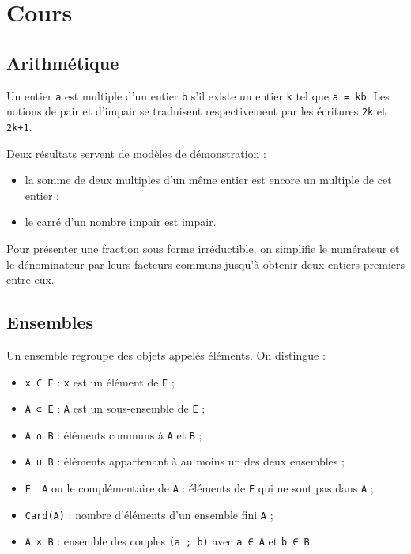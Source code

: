 \section{Cours}

\subsection{Arithmétique}

Un entier \texttt{a} est multiple d'un entier \texttt{b} s'il existe un entier \texttt{k} tel que \texttt{a = kb}. Les notions de pair et d'impair se traduisent respectivement par les écritures \texttt{2k} et \texttt{2k+1}.

Deux résultats servent de modèles de démonstration :

\begin{itemize}
\item la somme de deux multiples d'un même entier est encore un multiple de cet entier ;
\item le carré d'un nombre impair est impair.
\end{itemize}

Pour présenter une fraction sous forme irréductible, on simplifie le numérateur et le dénominateur par leurs facteurs communs jusqu'à obtenir deux entiers premiers entre eux.

\subsection{Ensembles}

Un ensemble regroupe des objets appelés éléments. On distingue :

\begin{itemize}
\item \texttt{x ∈ E} : \texttt{x} est un élément de \texttt{E} ;
\item \texttt{A ⊂ E} : \texttt{A} est un sous-ensemble de \texttt{E} ;
\item \texttt{A ∩ B} : éléments communs à \texttt{A} et \texttt{B} ;
\item \texttt{A ∪ B} : éléments appartenant à au moins un des deux ensembles ;
\item \texttt{E \ A} ou le complémentaire de \texttt{A} : éléments de \texttt{E} qui ne sont pas dans \texttt{A} ;
\item \texttt{Card(A)} : nombre d'éléments d'un ensemble fini \texttt{A} ;
\item \texttt{A × B} : ensemble des couples \texttt{(a ; b)} avec \texttt{a ∈ A} et \texttt{b ∈ B}.
\end{itemize}

